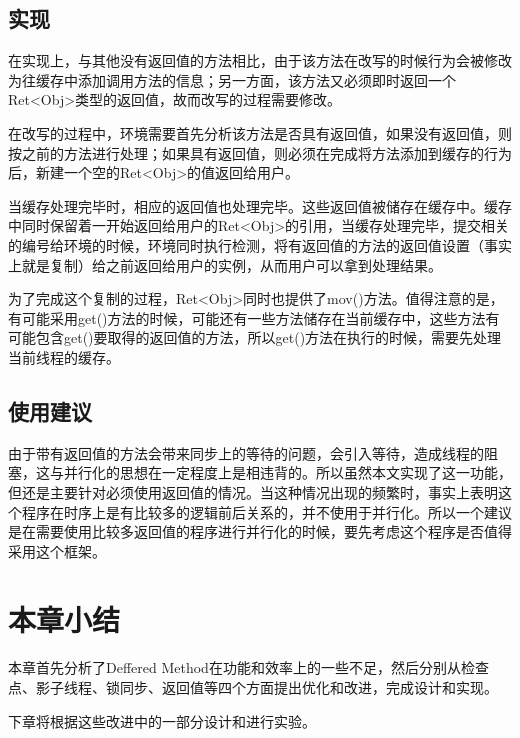 \subsection{实现}

在实现上，与其他没有返回值的方法相比，由于该方法在改写的时候行为会被修改为往缓存中添加调用方法的信息；另一方面，该方法又必须即时返回一个Ret<Obj>类型的返回值，故而改写的过程需要修改。

在改写的过程中，环境需要首先分析该方法是否具有返回值，如果没有返回值，则按之前的方法进行处理；如果具有返回值，则必须在完成将方法添加到缓存的行为后，新建一个空的Ret<Obj>的值返回给用户。

当缓存处理完毕时，相应的返回值也处理完毕。这些返回值被储存在缓存中。缓存中同时保留着一开始返回给用户的Ret<Obj>的引用，当缓存处理完毕，提交相关的编号给环境的时候，环境同时执行检测，将有返回值的方法的返回值设置（事实上就是复制）给之前返回给用户的实例，从而用户可以拿到处理结果。

为了完成这个复制的过程，Ret<Obj>同时也提供了mov()方法。值得注意的是，有可能采用get()方法的时候，可能还有一些方法储存在当前缓存中，这些方法有可能包含get()要取得的返回值的方法，所以get()方法在执行的时候，需要先处理当前线程的缓存。

\subsection{使用建议}

由于带有返回值的方法会带来同步上的等待的问题，会引入等待，造成线程的阻塞，这与并行化的思想在一定程度上是相违背的。所以虽然本文实现了这一功能，但还是主要针对必须使用返回值的情况。当这种情况出现的频繁时，事实上表明这个程序在时序上是有比较多的逻辑前后关系的，并不使用于并行化。所以一个建议是在需要使用比较多返回值的程序进行并行化的时候，要先考虑这个程序是否值得采用这个框架。

\section{本章小结}

本章首先分析了Deffered Method在功能和效率上的一些不足，然后分别从检查点、影子线程、锁同步、返回值等四个方面提出优化和改进，完成设计和实现。

下章将根据这些改进中的一部分设计和进行实验。
